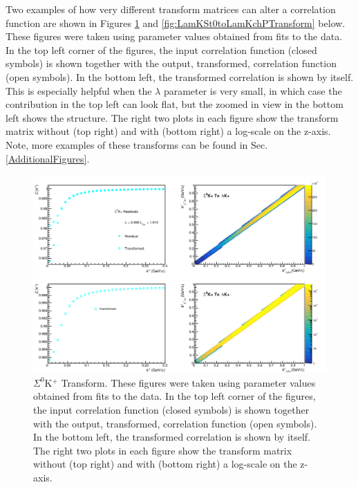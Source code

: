 \documentclass[../AnalysisNoteJBuxton.tex]{subfiles}
\begin{document}
Two examples of how very different transform matrices can alter a correlation function are shown in Figures \ref{fig:Sig0KchPtoLamKchPTransform} and \ref{fig:LamKSt0toLamKchPTransform} below.  These figures were taken using parameter values obtained from fits to the data.  In the top left corner of the figures, the input correlation function (closed symbols) is shown together with the output, transformed, correlation function (open symbols).  In the bottom left, the transformed correlation is shown by itself.  This is especially helpful when the $\lambda$ parameter is very small, in which case the contribution in the top left can look flat, but the zoomed in view in the bottom left shows the structure.  The right two plots in each figure show the transform matrix without (top right) and with (bottom right) a log-scale on the z-axis.  Note, more examples of these transforms can be found in Sec. \ref{AdditionalFigures}.

\begin{figure}[h]
  \centering
  \includegraphics[width=\textwidth]{5_Fitting/Figures/Residuals_LamKchP_0010_Sig0KchP_MomResCrctn_NonFlatBgdCrctn_10Res_PrimMaxDecay4fm_UsingXiDataAndCoulombOnly.pdf}
  \caption[$\Sigma^{0}$K$^{+}$ Transform]{$\Sigma^{0}$K$^{+}$ Transform.  These figures were taken using parameter values obtained from fits to the data.  In the top left corner of the figures, the input correlation function (closed symbols) is shown together with the output, transformed, correlation function (open symbols).  In the bottom left, the transformed correlation is shown by itself.  The right two plots in each figure show the transform matrix without (top right) and with (bottom right) a log-scale on the z-axis.}
  \label{fig:Sig0KchPtoLamKchPTransform}
\end{figure}
\end{document}
